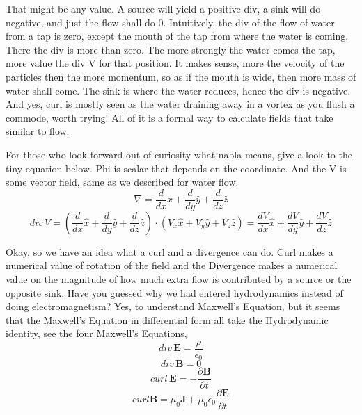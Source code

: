 \documentclass[11pt,a4paper]{article}
\renewcommand{\vec}[1]{\boldsymbol{#1}}
\begin{document}
That might be any value. A source will yield a positive div, a sink will do negative, and just the flow shall do 0. Intuitively, the div of the flow of water from a tap is zero, except the mouth of the tap from where the water is coming. There the div is more than zero. The more strongly the water comes the tap, more value the div V for that position. It makes sense, more the velocity of the particles then the more momentum, so as if the mouth is wide, then more mass of water shall come. The sink is where the water reduces, hence the div is negative. And yes, curl is mostly seen as the water draining away in a vortex as you flush a commode, worth trying! 
All of it is a formal way to calculate fields that take similar to flow.


For those who look forward out of curiosity what nabla means, give a look to the tiny equation below. Phi is scalar that depends on the coordinate. And the V is some vector field, same as we described for water flow.
	\begin{equation}
	\nabla =
	 	\frac{d}{dx} \hat{x}+ \frac{d}{dy} \hat{y} + \frac{d}{dz} \hat{z} 
	\end{equation}
	\begin{equation}
	div \, V =
	\left(\frac{d}{dx} \hat{x}+ \frac{d}{dy} \hat{y} + \frac{d}{dz} \hat{z}\right) \cdot
	(V_x \hat{x} + V_y \hat{y} + V_z \hat{z}) = 
	\frac{dV}{dx} \hat{x} + \frac{dV}{dy} \hat{y} + \frac{dV}{dz} \hat{z}
	\end{equation}


Okay, so we have an idea what a curl and a divergence can do. Curl makes a numerical value of rotation of the field and the Divergence makes a numerical value on the magnitude of how much extra flow is contributed by a source or the opposite sink. Have you guessed why we had entered hydrodynamics instead of doing electromagnetism? Yes, to understand Maxwell's Equation, but it seems that the Maxwell's Equation in differential form all take the Hydrodynamic identity, see the four Maxwell's Equations,
	\begin{equation}
	div \, \vec{E} = \frac{\rho}{\epsilon_0}
	\end{equation}
	\begin{equation}
	div \, \vec{B} = 0
	\end{equation}
	\begin{equation}
	curl \, \vec{E} = - \frac{\partial \vec{B}}{\partial t}
	\end{equation}
	\begin{equation}
	curl \vec{B} = \mu_0 \vec{J} + \mu_0 \epsilon_0 \frac{\partial \vec{E}}{\partial t}
	\end{equation}
	
\end{document}
